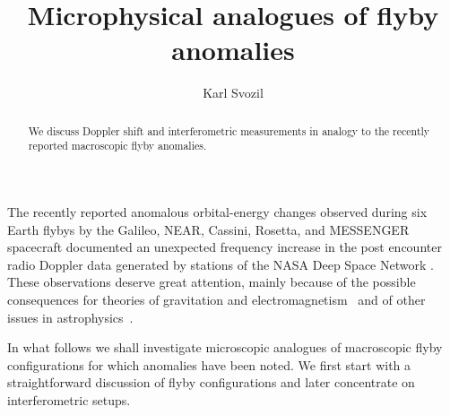 \documentclass[prl,preprint,amsfonts,showpacs,showkeys]{revtex4}
\begin{document}



\title{Microphysical analogues of flyby anomalies}


\author{Karl Svozil}


\begin{abstract}
We discuss Doppler shift and interferometric measurements in analogy to the recently reported macroscopic flyby anomalies.
\end{abstract}





\maketitle

The recently reported anomalous orbital-energy changes observed during six Earth flybys by the
Galileo, NEAR, Cassini, Rosetta, and MESSENGER spacecraft documented an unexpected frequency increase
in the post encounter radio Doppler data generated by stations of the NASA Deep Space Network \cite{anderson:091102,anderson:newast}.
These observations deserve great attention, mainly because of the possible consequences for theories of gravitation and electromagnetism~\cite{Dittus}
and of other issues in astrophysics~\cite{adler-arXiv:0805.2895,cahill-2008}.


In what follows we shall investigate microscopic analogues of macroscopic flyby configurations for which anomalies have been noted.
We first start with a straightforward discussion of flyby configurations and later concentrate on interferometric setups.
\end{document}
